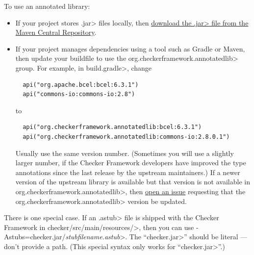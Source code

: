 To use an annotated library:

\begin{itemize}
\item
If your project stores \<.jar> files locally, then
\href{https://central.sonatype.com/search?q=org.checkerframework.annotatedlib}{download
  the \<.jar> file from the Maven Central Repository}.

\item
If your project manages dependencies using a tool such as Gradle or Maven,
then update your buildfile to use the \<org.checkerframework.annotatedlib>
group.  For example, in \<build.gradle>, change

\begin{Verbatim}
  api("org.apache.bcel:bcel:6.3.1")
  api("commons-io:commons-io:2.8")
\end{Verbatim}

\noindent
to

\begin{Verbatim}
  api("org.checkerframework.annotatedlib:bcel:6.3.1")
  api("org.checkerframework.annotatedlib:commons-io:2.8.0.1")
\end{Verbatim}

\noindent
Usually use the same version number.  (Sometimes you will use a slightly larger
number, if the Checker Framework developers have improved the type
annotations since the last release by the upstream maintainers.)  If a
newer version of the upstream library is available but that version is not
available in \<org.checkerframework.annotatedlib>, then
\hyperref[reporting-bugs]{open an issue} requesting that the
\<org.checkerframework.annotatedlib> version be updated.
\end{itemize}


There is one special case.  If an \<.astub> file is shipped with the
Checker Framework in \<checker/src/main/resources/>, then you can
use \<-Astubs=checker.jar/\emph{stubfilename.astub}>.
The ``\<checker.jar>'' should be literal --- don't provide a path.
(This special syntax only works for ``\<checker.jar>''.)




